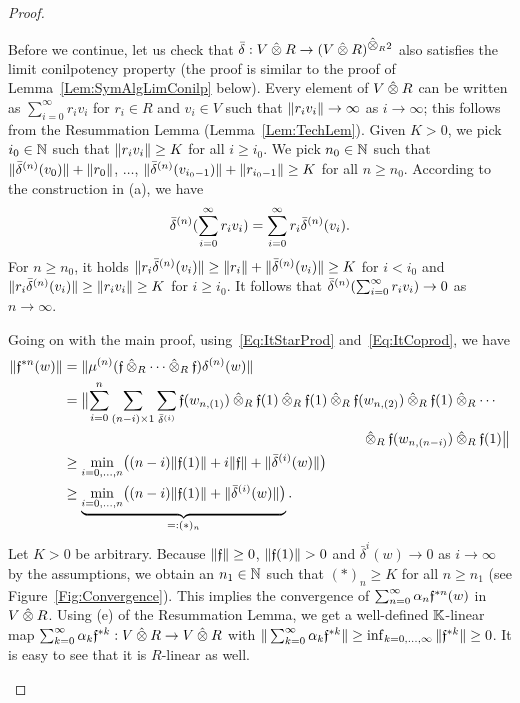 \documentclass[\MainFolder/Text.tex]{subfiles}
\begin{document}
\begin{proof}
\begin{ProofList}
Before we continue, let us check that $\bar{\MVCoProd}: V\COtimes R \rightarrow (V\COtimes R)^{\COtimes_R 2}$ also satisfies the limit conilpotency property (the proof is similar to the proof of Lemma~\ref{Lem:SymAlgLimConilp} below). Every element of $V\COtimes R$ can be written as $\sum_{i=0}^\infty r_i v_i$ for $r_i\in R$ and $v_i\in V$ such that $\| r_i v_i \| \to \infty$ as $i\to \infty$; this follows from the Resummation Lemma (Lemma~\ref{Lem:TechLem}). Given $K>0$, we pick $i_0\in \mathbb{N}$ such that $\| r_iv_i \|\ge K$ for all $i\ge i_0$. We pick $n_0\in \mathbb{N}$ such that $\| \bar{\delta}^{(n)}(v_0) \|+\| r_0 \|$, $\dotsc$, $\| \bar{\delta}^{(n)}(v_{i_0-1}) \|+\| r_{i_0-1} \| \ge K$ for all $n\ge n_0$. According to the construction in (a), we have 
\[ \bar{\delta}^{(n)}(\sum_{i=0}^\infty r_i v_i) = \sum_{i=0}^\infty r_i \bar{\delta}^{(n)}(v_i). \]
For $n\ge n_0$, it holds $\| r_i\bar{\delta}^{(n)}(v_i) \|\ge \| r_i \| + \| \bar{\delta}^{(n)}(v_i) \|\ge K$ for $i<i_0$ and $\| r_i\bar{\delta}^{(n)}(v_i) \|\ge \| r_i v_i \| \ge K$ for $i\ge i_0$. It follows that $\bar{\delta}^{(n)}(\sum_{i=0}^\infty r_i v_i) \to 0$ as $n\to \infty$.


Going on with the main proof, using~\eqref{Eq:ItStarProd} and~\eqref{Eq:ItCoprod}, we have
\begin{align*}
\Norm{\MVMorF^{\Star n}(w)} & = \Norm{\mu^{(n)}(\MVMorF\COtimes_R \dotsb \COtimes_R \MVMorF)\delta^{(n)}(w)} \\
 & = \begin{multlined}[t] \bigl\|\sum_{i=0}^n \sum_{(n-i)\times 1} \sum_{\bar{\delta}^{(i)}} \MVMorF(w_{n,(1)})\COtimes_R \MVMorF(1)\COtimes_R \MVMorF(1) \COtimes_R \MVMorF(w_{n,(2)}) \COtimes_R \MVMorF(1)\COtimes_R \dotsb \\ \COtimes_R \MVMorF(w_{n,(n-i)})\COtimes_R \MVMorF(1)\bigr\| \end{multlined}\\
 & \ge \min_{i=0,\dotsc,n}\bigl( (n-i) \Norm{\MVMorF(1)} + i \Norm{\MVMorF} + \Norm{\bar{\delta}^{(i)}(w)} \bigr) \\
& \ge \underbrace{\min_{i=0,\dotsc,n}\bigl( (n-i) \Norm{\MVMorF(1)} + \Norm{\bar{\delta}^{(i)}(w)} \bigr)}_{=:(*)_n}.
\end{align*}
Let $K>0$ be arbitrary. Because $\| \mathfrak{f} \|\ge 0$, $\Norm{\MVMorF(1)}>0$ and $\bar{\delta}^{i}(w) \to 0$ as $i\to \infty$ by the assumptions, we obtain an $n_1\in \mathbb{N}$ such that $(*)_n\ge K$ for all $n \ge n_1$ (see Figure~\ref{Fig:Convergence}).
This implies the convergence of $\sum_{n=0}^\infty \alpha_n\mathfrak{f}^{* n}(w)$ in $V\COtimes R$. Using (e) of the Resummation Lemma, we get a well-defined $\mathbb{K}$-linear map $\sum_{k=0}^\infty \alpha_k \MVMorF^{\Star k}: V\COtimes R \rightarrow V\COtimes R$ with $\| \sum_{k=0}^\infty \alpha_k \mathfrak{f}^{* k} \| \ge \inf_{k=0,\dotsc,\infty} \| \mathfrak{f}^{* k} \| \ge  0$. It is easy to see that it is $R$-linear as well. \qedhere
\end{ProofList}
\end{proof}
\end{document}
